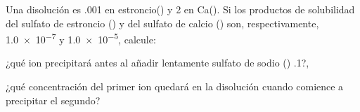 Una disolución es \SI{,001}{\Molar} en estroncio() y \SI{2}{\Molar} en Ca(). Si los productos de solubilidad del sulfato de estroncio () y del sulfato de calcio () son, respectivamente, \num{1,0e-7} y \num{1,0e-5}, calcule:
	\begin{enumerate*}[label={\alph*)},font=\bfseries]
		\item ¿qué ion precipitará antes al añadir lentamente sulfato de sodio () \SI{,1}{\Molar}?,
		\item ¿qué concentración del primer ion quedará en la disolución cuando comience a precipitar el segundo?
	\end{enumerate*}
